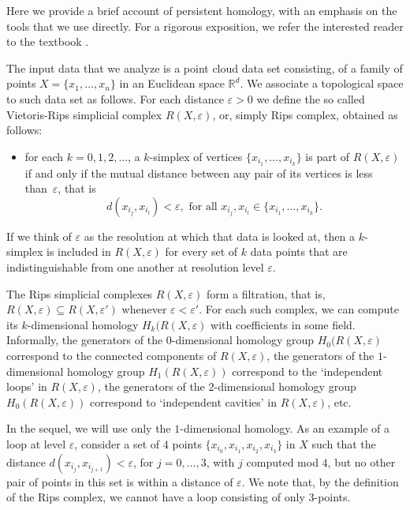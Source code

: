 \documentclass[preprint,12pt]{elsarticle}
\theoremstyle{definition}
\theoremstyle{remark}
\numberwithin{equation}{section}
\theoremstyle{definition}
\newcommand{\eps}{\varepsilon}
\begin{document}
Here we provide a brief account of persistent homology, with an emphasis on the tools that we use directly. For a rigorous exposition, we refer the interested reader to the textbook \cite{Edelsbrunner10}.

The input data that we analyze is a point cloud data set consisting, of a family of points  $X = \{x_1, \ldots ,x_n\}$ in an Euclidean space $\mathbb{R}^d$. We associate a topological space to such data set as follows. For each distance $\eps>0$ we define the so called
Vietoris-Rips simplicial complex $R(X, \eps)$, or, simply Rips complex, obtained as follows:\begin{itemize}\item for each $k=0,1,2, \ldots$, a $k$-simplex of vertices $\{x_{i_1},\ldots, x_{i_k}\}$ is part of $R(X,\eps)$ if and only if the mutual distance between  any pair of its   vertices is less than~$\eps$, that is \[d(x_{i_j},x_{i_l})<\eps, \textrm { for all } x_{i_j},x_{i_l}\in \{x_{i_1},\ldots, x_{i_k}\}. \]\end{itemize} If we think of $\eps$ as the resolution at which that data is looked at, then a $k$-simplex is included in $R(X,\eps)$   for every set of  $k$ data points that are indistinguishable from one another at   resolution level $\eps$.

The Rips simplicial complexes $R(X, \eps)$ form a filtration, that is, $R(X,\eps)\subseteq R(X,\eps')$ whenever $\eps<\eps'$. For each such complex, we can compute its $k$-dimensional homology $H_k(R(X,\eps)$ with coefficients in some field. Informally, the generators of the $0$-dimensional homology group $H_0(R(X,\eps)$  correspond to the connected components of $R(X,\eps)$, the generators of the $1$-dimensional homology group  $H_1(R(X,\eps))$ correspond to the  `independent loops' in $R(X,\eps)$,  the generators of the $2$-dimensional homology group $H_0(R(X,\eps))$ correspond to  `independent cavities' in $R(X,\eps)$, etc.

In the sequel, we will use only the $1$-dimensional homology. As an  example of a loop at level $\eps$, consider a set of  $4$ points $\{x_{i_0}, x_{i_1}, x_{i_2}, x_{i_3}\}$ in $X$ such that the distance $d(x_{i_j},x_{i_{j+1}})<\eps$, for $j=0,\ldots,3$, with $j$ computed mod $4$, but no other pair of points in this set is within a distance of $\eps$. We note that, by the definition of the Rips complex, we cannot have a loop consisting of only $3$-points.
\end{document}
